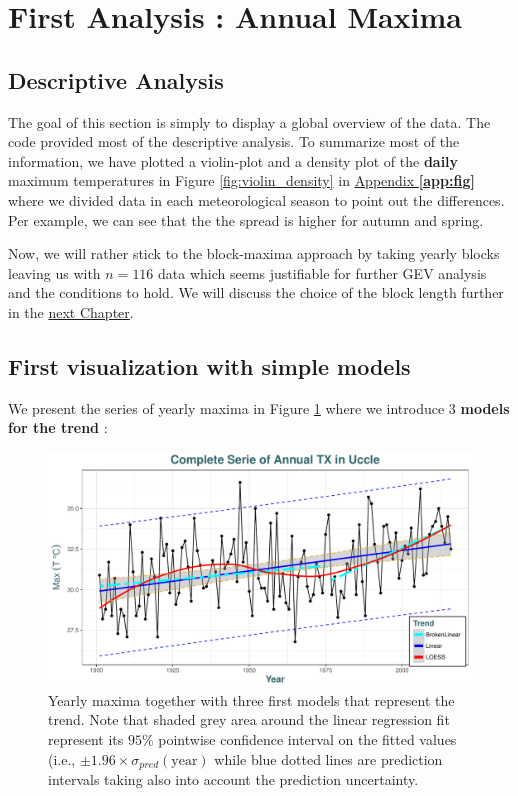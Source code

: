 \section{First Analysis : Annual Maxima}\label{sec:firstana}


\subsection{Descriptive Analysis}

The goal of this section is simply to display a global overview of the data. The code provided most of the descriptive analysis. To summarize most of the information, we have plotted a violin-plot and a density plot of the \textbf{daily} maximum temperatures in Figure \ref{fig:violin_density} in \hyperref[app:fig]{Appendix \textbf{\ref{app:fig}}} where we divided data in each meteorological season to point out the differences. Per example, we can see that the the spread is higher for autumn and spring.

Now, we will rather stick to the block-maxima approach by taking yearly blocks leaving us with $n=116$ data which seems justifiable for further GEV analysis and the conditions to hold. We will discuss the choice of the block length further in the \hyperref[sec:anagev]{next Chapter}.

\subsection{First visualization with simple models}\label{sec:firstvisu}

We present the series of yearly maxima in Figure \ref{first_fig} where we introduce 3 \textbf{models for the trend} :


\begin{figure}[!htb]
	\centering\includegraphics[width=.8\linewidth]{gg12.pdf}\caption{Yearly maxima together with three first models that represent the trend. Note that shaded grey area around the linear regression fit represent its $95\%$ pointwise confidence interval on the fitted values (i.e., $\pm 1.96\times \sigma_{pred}(\text{year})$ while blue dotted lines are prediction intervals taking also into account the prediction uncertainty.}%
\label{first_fig}
\end{figure}


